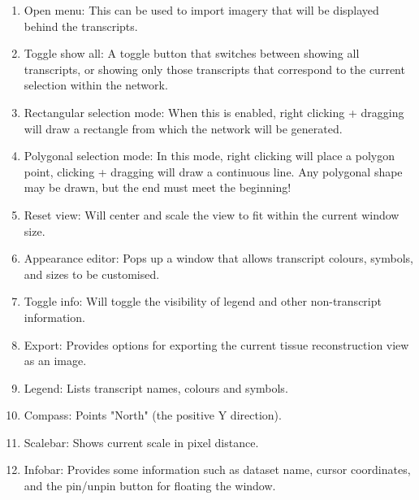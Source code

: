 \documentclass[a4paper,12pt]{article}
\begin{document}
\begin{enumerate}
	\item Open menu: This can be used to import imagery that will be displayed behind the transcripts.
	\item Toggle show all: A toggle button that switches between showing all transcripts, or showing only those transcripts that correspond to the current selection within the network.
	\item Rectangular selection mode: When this is enabled, right clicking + dragging will draw a rectangle from which the network will be generated.
	\item Polygonal selection mode: In this mode, right clicking will place a polygon point, clicking + dragging will draw a continuous line. Any polygonal shape may be drawn, but the end must meet the beginning!
	\item Reset view: Will center and scale the view to fit within the current window size.
	\item Appearance editor: Pops up a window that allows transcript colours, symbols, and sizes to be customised.
	\item Toggle info: Will toggle the visibility of legend and other non-transcript information.
	\item Export: Provides options for exporting the current tissue reconstruction view as an image.
	\item Legend: Lists transcript names, colours and symbols.
	\item Compass: Points "North" (the positive Y direction).
	\item Scalebar: Shows current scale in pixel distance.
	\item Infobar: Provides some information such as dataset name, cursor coordinates, and the pin/unpin button for floating the window.
\end{enumerate}
\end{document}
